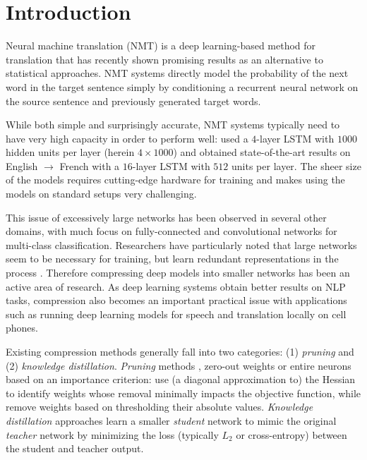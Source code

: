 \documentclass[11pt,letterpaper]{article}
\begin{document}
\section{Introduction}

Neural machine translation (NMT)
\cite{Kalchbrenner2013,Cho2014,Sutskever2014,Bahdanau2015} is a deep learning-based
method for translation that has recently shown promising results as
an alternative to statistical approaches.  NMT systems directly model
the probability of the next word in the target sentence simply by
conditioning a recurrent neural network on the source sentence and
previously generated target words. 

While both simple and surprisingly accurate, NMT systems typically
need to have very high capacity in order to perform well:  
used a $4$-layer LSTM with $1000$ hidden
units per layer (herein $4\times1000$) and  obtained
state-of-the-art results on English $\rightarrow$ French with a
$16$-layer LSTM with $512$ units per layer. The sheer size of the
models requires cutting-edge hardware for training and makes using the
models on standard setups very challenging. 

This issue of excessively large networks has been observed in several
other domains, with much focus on fully-connected and convolutional
networks for multi-class classification. Researchers have particularly
noted that large networks seem to be necessary for training, but learn
redundant representations in the process \cite{Denil2013}. Therefore compressing deep models into
smaller networks has been an active area of research. As deep learning
systems obtain better results on NLP tasks, compression also becomes
an important practical issue with applications such as running
deep learning models for speech and translation locally on
cell phones.

Existing compression methods generally fall into two categories: (1)
\textit{pruning} and (2) \textit{knowledge distillation}.
\textit{Pruning} methods 
\cite{LeCun1990,He2014,Han2016}, zero-out weights or entire neurons
based on an importance criterion:  use (a diagonal approximation to) the
Hessian to identify weights whose removal minimally impacts the
objective function, while  remove
weights based on thresholding their absolute values. 
\textit{Knowledge distillation} approaches
\cite{Bucila2006,Ba2014,Hinton2015} learn
a smaller \textit{student} network to mimic the original
\textit{teacher} network by minimizing the loss (typically $L_2$ or
cross-entropy) between the student and teacher output. 
\end{document}
